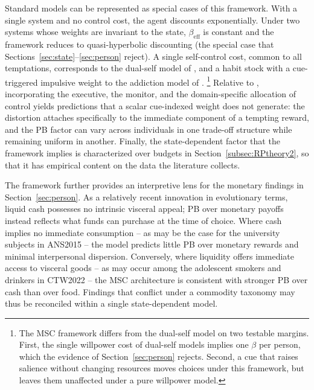 \documentclass[11pt,a4paper]{article}
\theoremstyle{plain}
\theoremstyle{definition}
\newcommand{\beff}{\beta_{\mathrm{eff}}}
\begin{document}
Standard models can be represented as special cases of this framework.
With a single system and no control cost, the agent discounts exponentially. 
Under two systems whose weights are invariant to the state, $\beff$ is constant and the framework reduces to quasi-hyperbolic discounting (the special case that Sections~\ref{sec:state}--\ref{sec:person} reject). 
A single self-control cost, common to all temptations, corresponds to the dual-self model of \citet{fudenberg2006}, and a habit stock with a cue-triggered impulsive weight to the addiction model of \citet{bernheimrangel2004}.%
\footnote{
The MSC framework differs from the dual-self model on two testable margins. First, the single willpower cost of dual-self models implies one $\beta$ per person, which the evidence of Section~\ref{sec:person} rejects. Second, a cue that raises salience without changing resources moves choices under this framework, but leaves them unaffected under a pure willpower model.} %
Relative to \citet{pennesi2020}, incorporating the executive, the monitor, and the domain-specific allocation of control yields predictions that a scalar cue-indexed weight does not generate: the distortion attaches specifically to the immediate component of a tempting reward, and the PB factor can vary across individuals in one trade-off structure while remaining uniform in another.
Finally, the state-dependent factor that the framework implies is characterized over budgets in Section~\ref{subsec:RPtheory2}, so that it has empirical content on the data the literature collects.

The framework further provides an interpretive lens for the monetary findings in Section~\ref{sec:person}.
As a relatively recent innovation in evolutionary terms, liquid cash possesses no intrinsic visceral appeal; PB over monetary payoffs instead reflects what funds can purchase at the time of choice.
Where cash implies no immediate consumption -- as may be the case for the university subjects in ANS2015 -- the model predicts little PB over monetary rewards and minimal interpersonal dispersion. Conversely, where liquidity offers immediate access to visceral goods -- as may occur among the adolescent smokers and drinkers in CTW2022 -- the MSC architecture is consistent with stronger PB over cash than over food.
Findings that conflict under a commodity taxonomy may thus be reconciled within a single state-dependent model.
\bigskip
\end{document}
